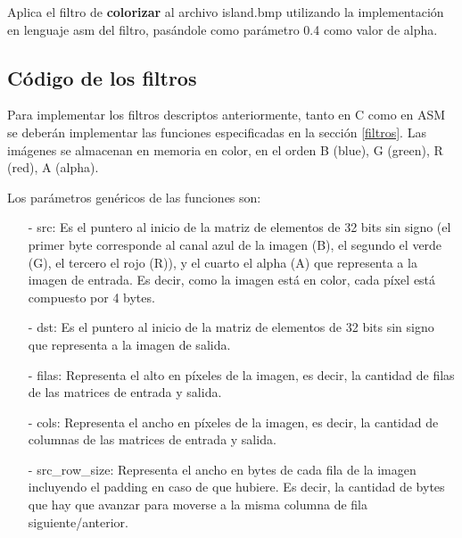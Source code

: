 \documentclass[a4paper, 12pt]{article}
\newcommand{\code}[1]{{\sffamily #1}\xspace}
\begin{document}
\noindent Aplica el filtro de \textbf{colorizar} al archivo island.bmp
utilizando la implementación en lenguaje asm del filtro, pasándole como parámetro 0.4 como valor de alpha.

\subsection{Código de los filtros}

Para implementar los filtros descriptos anteriormente, tanto en C como
en ASM se deberán implementar las funciones especificadas en la sección
\ref{filtros}.
Las imágenes se almacenan en memoria en color, en el orden
B (blue), G (green), R (red), A (alpha).

Los parámetros genéricos de las funciones son:
\begin{itemize}
  \itemsep0em
  \item[-]
      \code{src}\rmfamily: Es el puntero al inicio de la matriz de
      elementos de 32 bits sin signo (el primer byte corresponde al canal azul
      de la imagen (B), el segundo el verde (G), el tercero el rojo (R)), y el
      cuarto el alpha (A) que
      representa a la imagen de entrada. Es decir, como la imagen está en
      color, cada píxel está compuesto por 4 bytes.

   \item[-]
      \code{dst}\rmfamily: Es el puntero al inicio de la matriz de
      elementos de 32 bits sin signo que representa a la imagen de salida.

   \item[-]
      \code{filas}\rmfamily: Representa el alto en píxeles de la imagen, es
      decir, la cantidad de filas de las matrices de entrada y salida.

   \item[-]
      \code{cols}\rmfamily: Representa el ancho en píxeles de la imagen, es
      decir, la cantidad de columnas de las matrices de entrada y salida.

   \item[-]
      \code{src\_row\_size}\rmfamily: Representa el ancho en bytes de cada fila
      de la imagen incluyendo el padding en caso de que hubiere. Es decir, la cantidad de bytes que hay que avanzar para moverse a la misma columna de fila siguiente/anterior.
\end{itemize}

\end{document}
